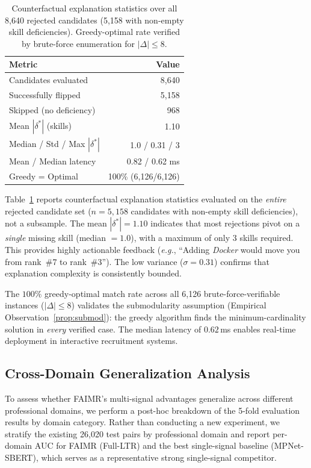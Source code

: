 \documentclass[smallcondensed,numbers]{sn-jnl}
\begin{document}
\begin{table}[t]
\centering
\caption{Counterfactual explanation statistics over all 8,640 rejected candidates (5,158 with non-empty skill deficiencies). Greedy-optimal rate verified by brute-force enumeration for $|\Delta| \leq 8$.}
\label{tab:counterfactual}
\begin{tabular}{@{}lr@{}}
\toprule
Metric & Value \\
\midrule
Candidates evaluated & 8,640 \\
Successfully flipped & 5,158 \\
Skipped (no deficiency) & 968 \\
Mean $|\delta^*|$ (skills) & 1.10 \\
Median / Std / Max $|\delta^*|$ & 1.0 / 0.31 / 3 \\
Mean / Median latency & 0.82 / 0.62 ms \\
Greedy = Optimal & 100\% (6,126/6,126) \\
\bottomrule
\end{tabular}
\end{table}

Table~\ref{tab:counterfactual} reports counterfactual explanation statistics evaluated on the \textit{entire} rejected candidate set ($n = 5{,}158$ candidates with non-empty skill deficiencies), not a subsample. The mean $|\delta^*| = 1.10$ indicates that most rejections pivot on a \textit{single} missing skill (median $= 1.0$), with a maximum of only 3 skills required. This provides highly actionable feedback (\textit{e.g.}, ``Adding \textit{Docker} would move you from rank~\#7 to rank~\#3''). The low variance ($\sigma = 0.31$) confirms that explanation complexity is consistently bounded.

The $100\%$ greedy-optimal match rate across all 6,126 brute-force-verifiable instances ($|\Delta| \leq 8$) validates the submodularity assumption (Empirical Observation~\ref{prop:submod}): the greedy algorithm finds the minimum-cardinality solution in \textit{every} verified case. The median latency of $0.62$\,ms enables real-time deployment in interactive recruitment systems.

\subsection{Cross-Domain Generalization Analysis}
\label{sec:crossdomain}

To assess whether FAIMR's multi-signal advantages generalize across different professional domains, we perform a post-hoc breakdown of the 5-fold evaluation results by domain category. Rather than conducting a new experiment, we stratify the existing 26,020 test pairs by professional domain and report per-domain AUC for FAIMR (Full-LTR) and the best single-signal baseline (MPNet-SBERT), which serves as a representative strong single-signal competitor.
\end{document}
